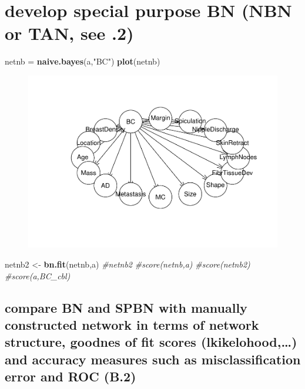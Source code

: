 \documentclass[]{article}
\newenvironment{Shaded}{\begin{snugshade}}{\end{snugshade}}
\newcommand{\KeywordTok}[1]{\textcolor[rgb]{0.13,0.29,0.53}{\textbf{{#1}}}}
\newcommand{\StringTok}[1]{\textcolor[rgb]{0.31,0.60,0.02}{{#1}}}
\newcommand{\CommentTok}[1]{\textcolor[rgb]{0.56,0.35,0.01}{\textit{{#1}}}}
\newcommand{\NormalTok}[1]{{#1}}
\begin{document}
\section{develop special purpose BN (NBN or TAN, see
.2)}\label{develop-special-purpose-bn-nbn-or-tan-see-.2}

\begin{Shaded}
\begin{Highlighting}[]
\NormalTok{netnb =}\StringTok{ }\KeywordTok{naive.bayes}\NormalTok{(a,}\StringTok{"BC"}\NormalTok{)}
\KeywordTok{plot}\NormalTok{(netnb)}
\end{Highlighting}
\end{Shaded}

\begin{figure}[htbp]
\centering
\includegraphics{BN_Ass2_files/figure-latex/unnamed-chunk-8-1.pdf}
\end{figure}

\begin{Shaded}
\begin{Highlighting}[]
\NormalTok{netnb2 <-}\StringTok{ }\KeywordTok{bn.fit}\NormalTok{(netnb,a)}
\CommentTok{#netnb2}
\CommentTok{#score(netnb,a)}
\CommentTok{#score(netnb2)}
\CommentTok{#score(a,BC_cbl)}
\end{Highlighting}
\end{Shaded}

\subsection{compare BN and SPBN with manually constructed network in
terms of network structure, goodnes of fit scores (lkikelohood,\ldots{})
and accuracy measures such as misclassification error and ROC
(B.2)}\label{compare-bn-and-spbn-with-manually-constructed-network-in-terms-of-network-structure-goodnes-of-fit-scores-lkikelohood-and-accuracy-measures-such-as-misclassification-error-and-roc-b.2}
\end{document}
